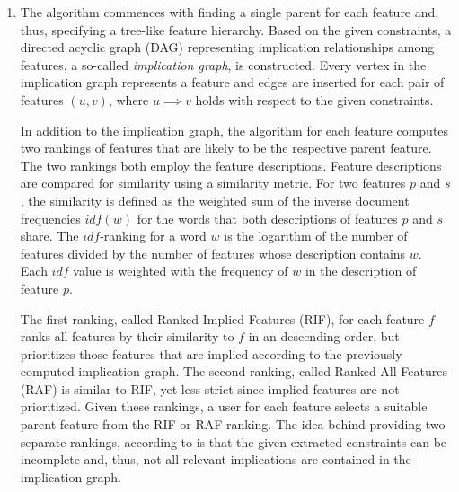 \begin{enumerate}
  \item The algorithm commences with finding a single parent for each
  feature and, thus, specifying a tree-like feature hierarchy. Based on the
  given constraints, a directed acyclic graph (DAG) representing implication
  relationships among features, a so-called \emph{implication graph}, is
  constructed.
  Every vertex in the implication graph represents a feature  and edges are
  inserted for each pair of features $(u, v)$, where  $u \implies v$ holds with respect to the given
  constraints.
   
  In addition to the implication graph, the algorithm for each feature computes
  two rankings of features that are likely to be the respective parent feature.
  The two rankings both employ the feature descriptions. Feature descriptions
  are compared for similarity using a similarity metric. For two features $p$
  and $s$, the similarity is defined as the weighted sum of the inverse document
  frequencies $idf(w)$ for the words that both descriptions of features $p$
  and $s$ share.
  The $idf$-ranking for a word $w$ is the logarithm of the number of features
  divided by the number of features whose description contains $w$. Each $idf$
  value is weighted with the frequency of $w$ in the description of
  feature $p$.
  
  The first ranking, called Ranked-Implied-Features (RIF), for each feature $f$
  ranks all features by their similarity to $f$ in an descending order, but
  prioritizes those features that are implied according to the previously
  computed implication graph. The second ranking, called Ranked-All-Features
  (RAF) is similar to RIF, yet less strict since implied features are not
  prioritized. Given these rankings, a user for each feature selects a suitable
  parent feature from the RIF or RAF ranking. The idea behind providing two
  separate rankings, according to \cite{she_reverse_2011} is that the given
  extracted constraints can be incomplete and, thus, not all relevant
  implications are contained in the implication graph.


\end{enumerate}
